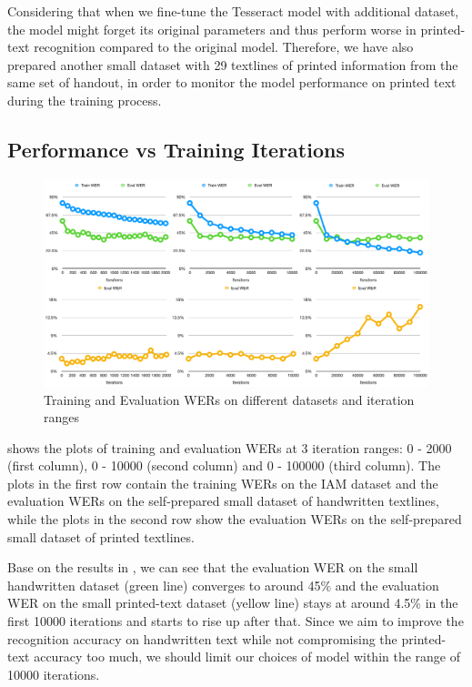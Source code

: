 Considering that when we fine-tune the Tesseract model with additional dataset, the model might forget its original parameters and thus perform worse in printed-text recognition compared to the original model. Therefore, we have also prepared another small dataset with 29 textlines of printed information from the same set of handout, in order to monitor the model performance on printed text during the training process.

\subsection{Performance vs Training Iterations}

\begin{figure}[!t]
  \centering
  \includegraphics[width=.95\textwidth]{tess-eval.png}
  \caption{Training and Evaluation WERs on different datasets and iteration ranges}
  \label{fig:tess-eval}
\end{figure}

 shows the plots of training and evaluation WERs at 3 iteration ranges: 0 - 2000 (first column), 0 - 10000 (second column) and 0 - 100000 (third column). The plots in the first row contain the training WERs on the IAM dataset and the evaluation WERs on the self-prepared small dataset of handwritten textlines, while the plots in the second row show the evaluation WERs on the self-prepared small dataset of printed textlines.

Base on the results in , we can see that the evaluation WER on the small handwritten dataset (green line) converges to around 45\% and the evaluation WER on the small printed-text dataset (yellow line) stays at around 4.5\% in the first 10000 iterations and starts to rise up after that. Since we aim to improve the recognition accuracy on handwritten text while not compromising the printed-text accuracy too much, we should limit our choices of model within the range of 10000 iterations.

